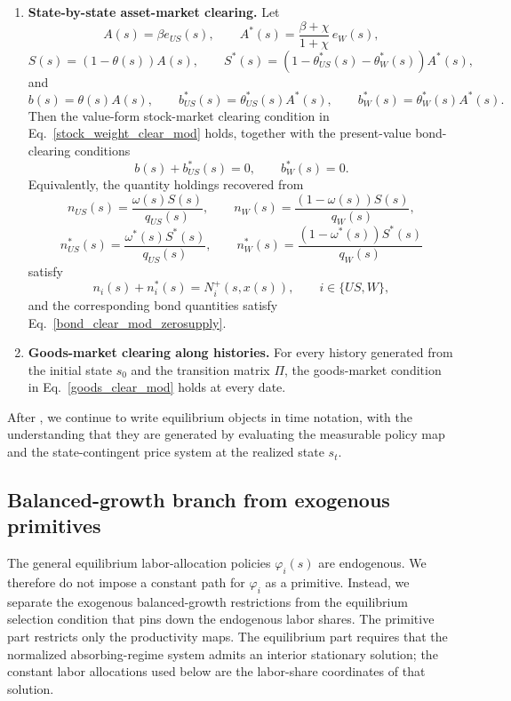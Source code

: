 \documentclass{article}
\begin{document}
\begin{defi}
\begin{enumerate}
    \item \textbf{State-by-state asset-market clearing.} Let
    \[
    A(s)=\beta e_{US}(s),
    \qquad
    A^*(s)=\frac{\beta+\chi}{1+\chi}\,e_W(s),
    \]
    \[
    S(s)=(1-\theta(s))A(s),
    \qquad
    S^*(s)=(1-\theta_{US}^*(s)-\theta_W^*(s))A^*(s),
    \]
    and
    \[
    b(s)=\theta(s)A(s),
    \qquad
    b_{US}^*(s)=\theta_{US}^*(s)A^*(s),
    \qquad
    b_W^*(s)=\theta_W^*(s)A^*(s).
    \]
    Then the value-form stock-market clearing condition in Eq.~\eqref{stock_weight_clear_mod} holds, together with the present-value bond-clearing conditions
    \[
    b(s)+b_{US}^*(s)=0,
    \qquad
    b_W^*(s)=0.
    \]
    Equivalently, the quantity holdings recovered from
    \[
    n_{US}(s)=\frac{\omega(s)S(s)}{q_{US}(s)},
    \qquad
    n_W(s)=\frac{(1-\omega(s))S(s)}{q_W(s)},
    \]
    \[
    n_{US}^*(s)=\frac{\omega^*(s)S^*(s)}{q_{US}(s)},
    \qquad
    n_W^*(s)=\frac{(1-\omega^*(s))S^*(s)}{q_W(s)}
    \]
    satisfy
    \[
    n_i(s)+n_i^*(s)=N_i^+(s,x(s)),
    \qquad
    i\in\{US,W\},
    \]
    and the corresponding bond quantities satisfy Eq.~\eqref{bond_clear_mod_zerosupply}.

    \item \textbf{Goods-market clearing along histories.} For every history generated from the initial state $s_0$ and the transition matrix $\Pi$, the goods-market condition in Eq.~\eqref{goods_clear_mod} holds at every date.
\end{enumerate}
\end{defi}

After , we continue to write equilibrium objects in time notation, with the understanding that they are generated by evaluating the measurable policy map and the state-contingent price system at the realized state $s_t$.

\subsection{Balanced-growth branch from exogenous primitives}

The general equilibrium labor-allocation policies $\varphi_i(s)$ are endogenous. We therefore do not impose a constant path for $\varphi_i$ as a primitive. Instead, we separate the exogenous balanced-growth restrictions from the equilibrium selection condition that pins down the endogenous labor shares. The primitive part restricts only the productivity maps. The equilibrium part requires that the normalized absorbing-regime system admits an interior stationary solution; the constant labor allocations used below are the labor-share coordinates of that solution.
\end{document}
